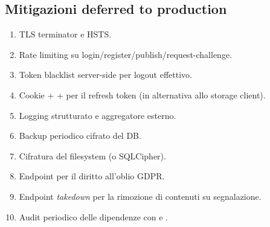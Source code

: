 \subsection{Mitigazioni deferred to production}
\begin{enumerate}
    \item TLS terminator e HSTS.
    \item Rate limiting su login/register/publish/request-challenge.
    \item Token blacklist server-side per logout effettivo.
    \item Cookie  +  + 
    per il refresh token (in alternativa allo storage client).
    \item Logging strutturato e aggregatore esterno.
    \item Backup periodico cifrato del DB.
    \item Cifratura del filesystem (o SQLCipher).
    \item Endpoint  per il diritto all'oblio
    GDPR.
    \item Endpoint \emph{takedown} per la rimozione di contenuti su
    segnalazione.
    \item Audit periodico delle dipendenze con  e
    .
\end{enumerate}
